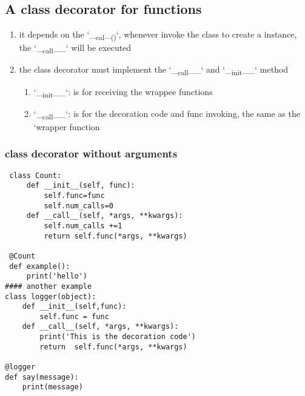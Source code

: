 \documentclass[11pt]{article}
\begin{document}
\subsection{A class decorator for functions}
\label{sec:orgd1a8f6a}
\begin{enumerate}
\item it depends on the `\_\textsubscript{cal}\_\textsubscript{()}`, whenever invoke the class to create a instance, the `\_\textsubscript{call}\_\_` will be executed
\label{sec:orga74a1d7}
\item the class decorator must implement the `\_\textsubscript{call}\_\_` and `\_\textsubscript{init}\_\_` method
\label{sec:org1b25859}
\begin{enumerate}
\item `\_\textsubscript{init}\_\_`: is for receiving the wrappee functions
\label{sec:orgdd86739}
\item `\_\textsubscript{call}\_\_`: is for the decoration code and func invoking, the same as the `wrapper function
\label{sec:org0f04663}
\end{enumerate}
\end{enumerate}
\subsubsection{class decorator without arguments}
\label{sec:org5053764}
\begin{verbatim}
 class Count:
     def __init__(self, func):
         self.func=func
         self.num_calls=0
     def __call__(self, *args, **kwargs):
         self.num_calls +=1
         return self.func(*args, **kwargs)

 @Count
 def example():
     print('hello')
#### another example
class logger(object):
    def __init__(self,func):
        self.func = func
    def __call__(self, *args, **kwargs):
        print('This is the decoration code')
        return  self.func(*args, **kwargs)

@logger
def say(message):
    print(message)
\end{verbatim}
\end{document}
